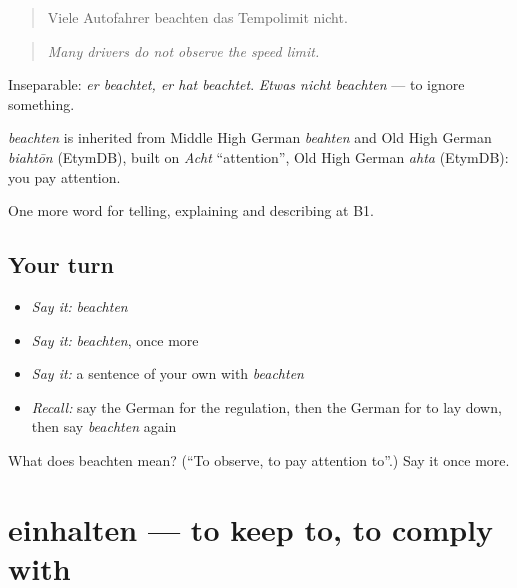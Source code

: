 \begin{quote}
Viele Autofahrer beachten das Tempolimit nicht.
\end{quote}

\begin{quote}
\emph{Many drivers do not observe the speed limit.}
\end{quote}

Inseparable: \emph{er beachtet, er hat beachtet}. \emph{Etwas nicht beachten} — to ignore something.

\begin{cousinweb}
\emph{beachten} is inherited from Middle High German \emph{beahten} and Old High German \emph{biahtōn} (EtymDB), built on \emph{Acht} \textquotedblleft{}attention\textquotedblright{}, Old High German \emph{ahta} (EtymDB): you pay attention.
\end{cousinweb}

\begin{grammarlens}[title={What you've built}]
One more word for telling, explaining and describing at B1.
\end{grammarlens}

\subsection*{Your turn}
\begin{itemize}
\raggedright
  \item \emph{Say it:} \emph{beachten}
  \item \emph{Say it:} \emph{beachten}, once more
  \item \emph{Say it:} a sentence of your own with \emph{beachten}
  \item \emph{Recall:} say the German for the regulation, then the German for to lay down, then say \emph{beachten} again
\end{itemize}

\begin{tcolorbox}[breakable,colback=teal!4,colframe=teal!35!black,title={Before you move on}]
What does beachten mean? (\textquotedblleft{}To observe, to pay attention to\textquotedblright{}.) Say it once more.
\end{tcolorbox}
\section[einhalten]{einhalten — to keep to, to comply with}

\label{lesson:GE-C381-einhalten}



